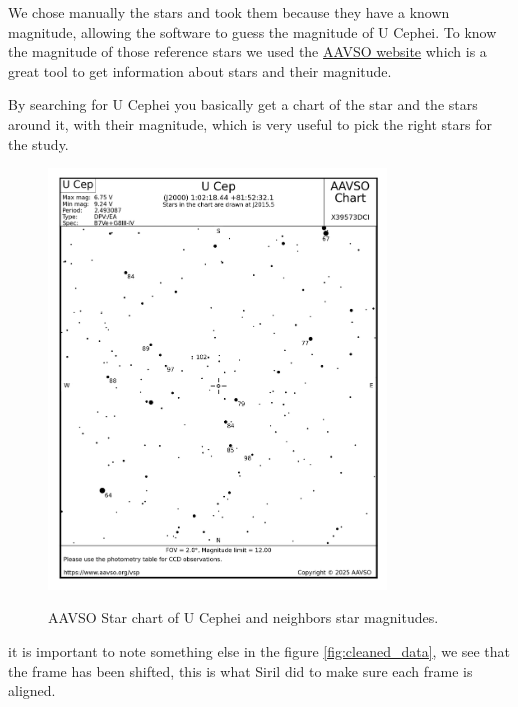\documentclass[12pt,a4paper]{article}
\begin{document}
\bigskip

We chose manually the stars and took them because they have a known magnitude, allowing the software to guess the magnitude of U Cephei.
To know the magnitude of those reference stars we used the \href{https://apps.aavso.org/vsp/chart/?star=U+Cep&fov=120.0&maglimit=12.0}{AAVSO website} \cite{AAVSO} which is a great tool to get information about stars and their magnitude.

By searching for U Cephei you basically get a chart of the star and the stars around it, with their magnitude, which is very useful to pick the right stars for the study.

\bigskip


\begin{figure}[H]
    \centering
    \includegraphics[width=0.8\textwidth]{assets/ucep-stars-mag.png}
    \caption{AAVSO Star chart of U Cephei and neighbors star magnitudes.} \cite{AVVSOVariableStarPlotter}
    \label{fig:Ucep-stars-chart}
\end{figure}

\bigskip

it is important to note something else in the figure \ref{fig:cleaned_data}, we see that the frame has been shifted, this is what Siril did to make sure each frame is aligned.

\medskip
\end{document}
